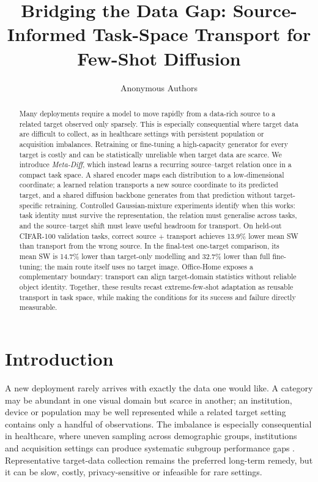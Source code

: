 \documentclass{article}
\title{Bridging the Data Gap: Source-Informed Task-Space Transport for Few-Shot Diffusion}
\author{Anonymous Authors}
\date{}
\begin{document}
\maketitle

\begin{abstract}
Many deployments require a model to move rapidly from a data-rich source to a related target observed only sparsely. This is especially consequential where target data are difficult to collect, as in healthcare settings with persistent population or acquisition imbalances. Retraining or fine-tuning a high-capacity generator for every target is costly and can be statistically unreliable when target data are scarce. We introduce \emph{Meta-Diff}, which instead learns a recurring source--target relation once in a compact task space. A shared encoder maps each distribution to a low-dimensional coordinate; a learned relation transports a new source coordinate to its predicted target, and a shared diffusion backbone generates from that prediction without target-specific retraining. Controlled Gaussian-mixture experiments identify when this works: task identity must survive the representation, the relation must generalise across tasks, and the source--target shift must leave useful headroom for transport. On held-out CIFAR-100 validation tasks, correct source $+$ transport achieves 13.9\% lower mean SW than transport from the wrong source. In the final-test one-target comparison, its mean SW is 14.7\% lower than target-only modelling and 32.7\% lower than full fine-tuning; the main route itself uses no target image. Office-Home exposes a complementary boundary: transport can align target-domain statistics without reliable object identity. Together, these results recast extreme-few-shot adaptation as reusable transport in task space, while making the conditions for its success and failure directly measurable.
\end{abstract}

\section{Introduction}
A new deployment rarely arrives with exactly the data one would like. A category may be abundant in one visual domain but scarce in another; an institution, device or population may be well represented while a related target setting contains only a handful of observations. The imbalance is especially consequential in healthcare, where uneven sampling across demographic groups, institutions and acquisition settings can produce systematic subgroup performance gaps \citep{larrazabal2020gender,seyyedkalantari2021underdiagnosis,daneshjou2022ddi}. Representative target-data collection remains the preferred long-term remedy, but it can be slow, costly, privacy-sensitive or infeasible for rare settings.
\end{document}
